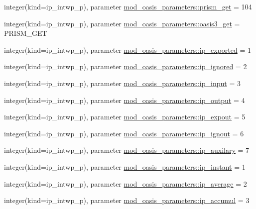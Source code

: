 \begin{DoxyCompactItemize}
\item 
integer(kind=ip\+\_\+intwp\+\_\+p), parameter \hyperlink{namespacemod__oasis__parameters_a136a476f2771e33d12e42b47eef72f9b}{mod\+\_\+oasis\+\_\+parameters\+::prism\+\_\+get} = 104
\item 
integer(kind=ip\+\_\+intwp\+\_\+p), parameter \hyperlink{namespacemod__oasis__parameters_aa2ac99363b8f1aa7ff950fda3e3f5fff}{mod\+\_\+oasis\+\_\+parameters\+::oasis3\+\_\+get} = P\+R\+I\+S\+M\+\_\+\+G\+ET
\item 
integer(kind=ip\+\_\+intwp\+\_\+p), parameter \hyperlink{namespacemod__oasis__parameters_a0f729cda95773cdc8df800eacdceb606}{mod\+\_\+oasis\+\_\+parameters\+::ip\+\_\+exported} = 1
\item 
integer(kind=ip\+\_\+intwp\+\_\+p), parameter \hyperlink{namespacemod__oasis__parameters_ae3733a399c07b165b5ad19543ca1d2a2}{mod\+\_\+oasis\+\_\+parameters\+::ip\+\_\+ignored} = 2
\item 
integer(kind=ip\+\_\+intwp\+\_\+p), parameter \hyperlink{namespacemod__oasis__parameters_a6a7bcd0e3a33573729f94098ecd9a922}{mod\+\_\+oasis\+\_\+parameters\+::ip\+\_\+input} = 3
\item 
integer(kind=ip\+\_\+intwp\+\_\+p), parameter \hyperlink{namespacemod__oasis__parameters_a556f148d126d8d6dfe711656024436e6}{mod\+\_\+oasis\+\_\+parameters\+::ip\+\_\+output} = 4
\item 
integer(kind=ip\+\_\+intwp\+\_\+p), parameter \hyperlink{namespacemod__oasis__parameters_ae91d5161b091e1f07e6ee64a38514df6}{mod\+\_\+oasis\+\_\+parameters\+::ip\+\_\+expout} = 5
\item 
integer(kind=ip\+\_\+intwp\+\_\+p), parameter \hyperlink{namespacemod__oasis__parameters_a4d283e27ebb49e8d97a35842f10d9aec}{mod\+\_\+oasis\+\_\+parameters\+::ip\+\_\+ignout} = 6
\item 
integer(kind=ip\+\_\+intwp\+\_\+p), parameter \hyperlink{namespacemod__oasis__parameters_a4e90463865a09309212e947e8c8546ac}{mod\+\_\+oasis\+\_\+parameters\+::ip\+\_\+auxilary} = 7
\item 
integer(kind=ip\+\_\+intwp\+\_\+p), parameter \hyperlink{namespacemod__oasis__parameters_a1028581caadcb9d7506b25c6cd3efd01}{mod\+\_\+oasis\+\_\+parameters\+::ip\+\_\+instant} = 1
\item 
integer(kind=ip\+\_\+intwp\+\_\+p), parameter \hyperlink{namespacemod__oasis__parameters_a5e40e91da22fca8f2b6a9d4f1c1ace5d}{mod\+\_\+oasis\+\_\+parameters\+::ip\+\_\+average} = 2
\item 
integer(kind=ip\+\_\+intwp\+\_\+p), parameter \hyperlink{namespacemod__oasis__parameters_adfaf98517b8396e4ba667f2f8bcd0ed5}{mod\+\_\+oasis\+\_\+parameters\+::ip\+\_\+accumul} = 3

\end{DoxyCompactItemize}

